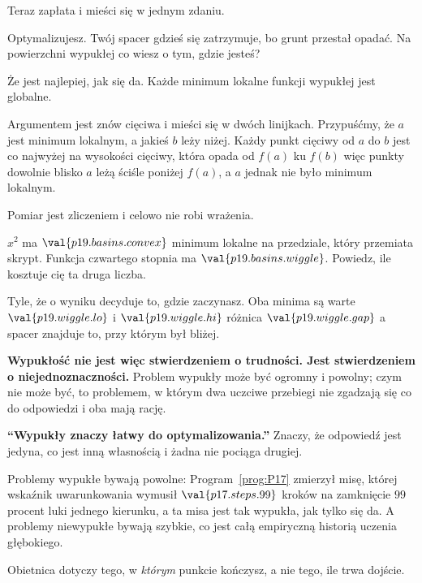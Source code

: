 \begin{fr}
Teraz zapłata i mieści się w jednym zdaniu.

Optymalizujesz. Twój spacer gdzieś się zatrzymuje, bo grunt przestał opadać.
Na powierzchni wypukłej co wiesz o tym, gdzie jesteś?
\nextframe
\end{fr}

\begin{fr}
\begin{ansblock}
Że jest najlepiej, jak się da. Każde minimum lokalne funkcji wypukłej jest
globalne.
\end{ansblock}

Argumentem jest znów cięciwa i mieści się w dwóch linijkach. Przypuśćmy, że
$a$ jest minimum lokalnym, a jakieś $b$ leży niżej. Każdy punkt cięciwy od $a$
do $b$ jest co najwyżej na wysokości cięciwy, która opada od $f(a)$ ku $f(b)$
\dash{} więc punkty dowolnie blisko $a$ leżą ściśle poniżej $f(a)$, a $a$
jednak nie było minimum lokalnym.

\end{fr}

\begin{fr}
Pomiar jest zliczeniem i celowo nie robi wrażenia.

$x^{2}$ ma $\val{p19.basins.convex}$ minimum lokalne na przedziale, który
przemiata skrypt. Funkcja czwartego stopnia ma $\val{p19.basins.wiggle}$.
Powiedz, ile kosztuje cię ta druga liczba.
\dotline
\nextframe
\end{fr}

\begin{fr}
\begin{ansblock}
Tyle, że o wyniku decyduje to, gdzie zaczynasz. Oba minima są warte
$\val{p19.wiggle.lo}$ i $\val{p19.wiggle.hi}$ \dash{} różnica
$\val{p19.wiggle.gap}$ \dash{} a spacer znajduje to, przy którym był bliżej.
\end{ansblock}

\textbf{Wypukłość nie jest więc stwierdzeniem o trudności. Jest stwierdzeniem
o niejednoznaczności.} Problem wypukły może być ogromny i powolny; czym nie
może być, to problemem, w którym dwa uczciwe przebiegi nie zgadzają się co do
odpowiedzi i oba mają rację.

\begin{trapbox}
\textbf{\enquote{Wypukły znaczy łatwy do optymalizowania.}} Znaczy, że
odpowiedź jest jedyna, co jest inną własnością i żadna nie pociąga drugiej.

Problemy wypukłe bywają powolne: Program~\ref{prog:P17} zmierzył misę, której
wskaźnik uwarunkowania wymusił $\val{p17.steps.99}$ kroków na zamknięcie
$99$ procent luki jednego kierunku, a ta misa jest tak wypukła, jak tylko się
da. A problemy niewypukłe bywają szybkie, co jest całą empiryczną historią
uczenia głębokiego.

Obietnica dotyczy tego, w \emph{którym} punkcie kończysz, a nie tego, ile
trwa dojście.
\end{trapbox}
\end{fr}

